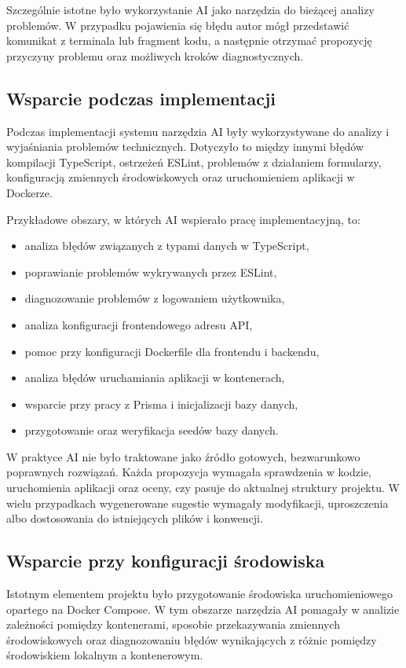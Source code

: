 Szczególnie istotne było wykorzystanie AI jako narzędzia do bieżącej analizy problemów. W przypadku pojawienia się błędu autor mógł przedstawić komunikat z terminala lub fragment kodu, a następnie otrzymać propozycję przyczyny problemu oraz możliwych kroków diagnostycznych.

\subsection{Wsparcie podczas implementacji}

Podczas implementacji systemu narzędzia AI były wykorzystywane do analizy i wyjaśniania problemów technicznych. Dotyczyło to między innymi błędów kompilacji TypeScript, ostrzeżeń ESLint, problemów z działaniem formularzy, konfiguracją zmiennych środowiskowych oraz uruchomieniem aplikacji w Dockerze.

Przykładowe obszary, w których AI wspierało pracę implementacyjną, to:
\begin{itemize}
    \item analiza błędów związanych z typami danych w TypeScript,
    \item poprawianie problemów wykrywanych przez ESLint,
    \item diagnozowanie problemów z logowaniem użytkownika,
    \item analiza konfiguracji frontendowego adresu API,
    \item pomoc przy konfiguracji Dockerfile dla frontendu i backendu,
    \item analiza błędów uruchamiania aplikacji w kontenerach,
    \item wsparcie przy pracy z Prisma i inicjalizacji bazy danych,
    \item przygotowanie oraz weryfikacja seedów bazy danych.
\end{itemize}

W praktyce AI nie było traktowane jako źródło gotowych, bezwarunkowo poprawnych rozwiązań. Każda propozycja wymagała sprawdzenia w kodzie, uruchomienia aplikacji oraz oceny, czy pasuje do aktualnej struktury projektu. W wielu przypadkach wygenerowane sugestie wymagały modyfikacji, uproszczenia albo dostosowania do istniejących plików i konwencji.

\subsection{Wsparcie przy konfiguracji środowiska}

Istotnym elementem projektu było przygotowanie środowiska uruchomieniowego opartego na Docker Compose. W tym obszarze narzędzia AI pomagały w analizie zależności pomiędzy kontenerami, sposobie przekazywania zmiennych środowiskowych oraz diagnozowaniu błędów wynikających z różnic pomiędzy środowiskiem lokalnym a kontenerowym.

